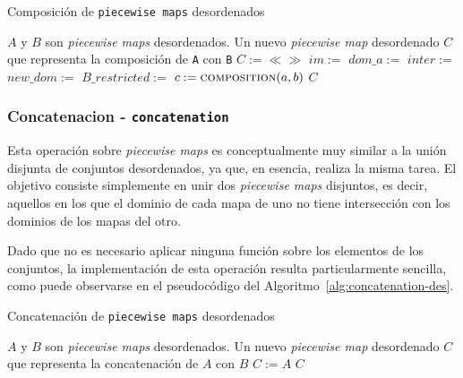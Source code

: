 \begin{algorithm}
\caption{Composición de \texttt{piecewise maps} desordenados}
\label{alg:composition-des}
\begin{algorithmic}[1]
\Require $A$ y $B$ son \textit{piecewise maps} desordenados.
\Ensure Un nuevo \textit{piecewise map} desordenado $C$ que representa la composición de \texttt{A} con \texttt{B}
    \State $C := \ll\gg$
    \State $im :=$ 
     \State $dom\_a :=$ 
    \State $inter :=$  
    \State $new\_dom :=$ 
    \State $B\_restricted :=$ 
            \State $c := \Call{composition}{a, b}$
            \State {}
        \EndFor
    \EndFor
    \State \Return $C$
\EndFunction
\end{algorithmic}
\end{algorithm}


\subsubsection{Concatenacion - \texttt{concatenation}}

Esta operación sobre \textit{piecewise maps} es conceptualmente muy similar a la unión disjunta de conjuntos desordenados, ya que, en esencia, realiza la misma tarea. El objetivo consiste simplemente en unir dos \textit{piecewise maps} disjuntos, es decir, aquellos en los que el dominio de cada mapa de uno no tiene intersección con los dominios de los mapas del otro.

Dado que no es necesario aplicar ninguna función sobre los elementos de los conjuntos, la implementación de esta operación resulta particularmente sencilla, como puede observarse en el pseudocódigo del Algoritmo~\ref{alg:concatenation-des}.

\begin{algorithm}
\caption{Concatenación de \texttt{piecewise maps} desordenados}
\label{alg:concatenation-des}
\begin{algorithmic}[1]
\Require $A$ y $B$ son \textit{piecewise maps} desordenados.
\Ensure Un nuevo \textit{piecewise map} desordenado $C$ que representa la concatenación de $A$ con $B$
    \State  $C := A$ 
        \State {}
    \EndFor
    \State \Return $C$
\EndFunction
\end{algorithmic}
\end{algorithm}


